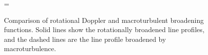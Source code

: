 \begin{figure} %
\epsfxsize=\figwidth
\setlength{\cen}{(\textwidth / 2) - (\epsfxsize / 2)}
\hspace{\cen}
\caption[Comparison of rotational Doppler and macroturbulent broadening 
functions]
{\fcfont Comparison of rotational Doppler and macroturbulent broadening
functions. Solid lines show the rotationally broadened line profiles,
and the dashed lines are the line profile broadened by macroturbulence.}

\label{fig:brfunc:comparison}
\end{figure}   %

